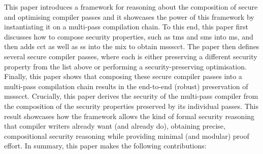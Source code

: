 \documentclass[dvipsnames,conference]{IEEEtran}
\theoremstyle{definition}
\begin{document}
This paper introduces a framework for reasoning about the composition of secure and optimising compiler passes %
and it showcases the power of this framework by instantiating it on a multi-pass compilation chain.
To this end, this paper first discusses how to compose security properties, such as \gls*{tms} and \gls*{sms} into \gls*{ms}, and then adds \gls*{cct} as well as \gls*{ss} into the mix to obtain \gls*{mssscct}.
The paper then defines several secure compiler passes, where each is either preserving a different security property from the list above
or performing a security-preserving optimisation.
Finally, this paper shows that composing these secure compiler passes into a multi-pass compilation chain results in the end-to-end (robust) preservation of \gls*{mssscct}.
Crucially, this paper derives the security of the multi-pass compiler from the composition of the security properties preserved by its individual passes.
This result showcases how the framework allows the kind of formal security reasoning that compiler writers already want (and already do), obtaining precise, compositional security reasoning while providing minimal (and modular) proof effort.
%
In summary, this paper makes the following contributions:
\end{document}
